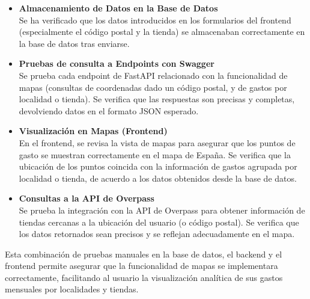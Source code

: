 \begin{itemize}
    \item \textbf{Almacenamiento de Datos en la Base de Datos}\\
     Se ha verificado que los datos introducidos en los formularios del frontend (especialmente el código postal y la tienda) se almacenaban correctamente en la base de datos tras enviarse. 
    \item \textbf{Pruebas de consulta a Endpoints con Swagger}\\
     Se prueba cada endpoint de FastAPI relacionado con la funcionalidad de mapas (consultas de coordenadas dado un código postal, y de gastos por localidad o tienda). Se verifica que las respuestas son precisas y completas, devolviendo datos en el formato JSON esperado.
    \item \textbf{Visualización en Mapas (Frontend)}\\
     En el frontend, se revisa la vista de mapas para asegurar que los puntos de gasto se muestran correctamente en el mapa de España. Se verifica que la ubicación de los puntos coincida con la información de gastos agrupada por localidad o tienda, de acuerdo a los datos obtenidos desde la base de datos.
    \item \textbf{Consultas a la API de Overpass}\\
     Se prueba la integración con la API de Overpass para obtener información de tiendas cercanas a la ubicación del usuario (o código postal). Se verifica que los datos retornados sean precisos y se reflejan adecuadamente en el mapa.
\end{itemize}

Esta combinación de pruebas manuales en la base de datos, el backend y el frontend permite asegurar que la funcionalidad de mapas se implementara correctamente, facilitando al usuario la visualización analítica de sus gastos mensuales por localidades y tiendas.



